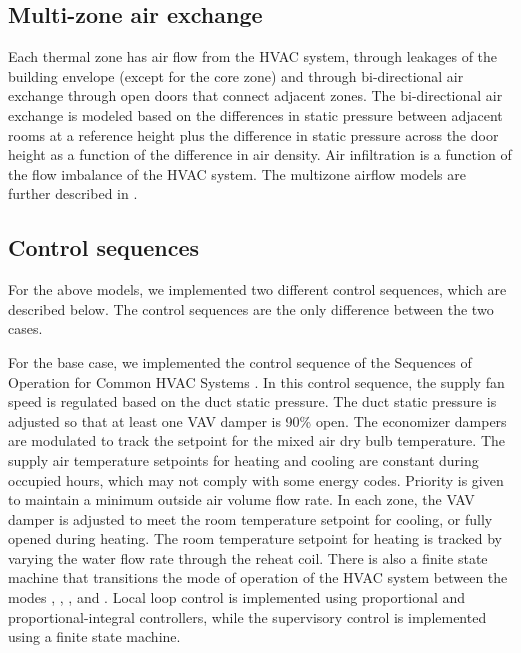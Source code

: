 \documentclass[letterpaper,10pt, openany,english]{sphinxmanual}
\begin{document}
\subsection{Multi-zone air exchange}
\label{\detokenize{example:multi-zone-air-exchange}}
Each thermal zone has air flow from the HVAC system,
through leakages of the building envelope (except for the core zone)
and through bi-directional air exchange through open doors that connect adjacent zones.
The bi-directional air exchange is modeled based on the differences
in static pressure between adjacent rooms at a reference height
plus the difference in static pressure across the door height
as a function of the difference in air density.
Air infiltration is a function of the
flow imbalance of the HVAC system.
The multizone airflow models are further described in
.


\subsection{Control sequences}
\label{\detokenize{example:control-sequences}}\label{\detokenize{example:sec-con-seq-des}}
For the above models, we implemented two different control sequences, which
are described below. The control sequences are the only difference between
the two cases.

For the base case, we implemented the control sequence
 of the Sequences of Operation for
Common HVAC Systems .
In this control sequence, the
supply fan speed is regulated based on the duct static pressure.
The duct static pressure is adjusted
so that at least one VAV damper is 90\% open.
The economizer dampers
are modulated to track the setpoint for the mixed air dry bulb temperature.
The supply air temperature setpoints for heating and cooling are constant
during occupied hours, which may not comply with some energy codes.
Priority is given to maintain a minimum outside air volume flow rate.
In each zone, the VAV damper is adjusted to meet the room temperature
setpoint for cooling, or fully opened during heating.
The room temperature setpoint for heating is tracked by varying
the water flow rate through the reheat coil. There is also a
finite state machine that transitions the mode of operation of
the HVAC system between the modes
, , ,
 and .
Local loop control is implemented using proportional and proportional-integral
controllers, while the supervisory control is implemented
using a finite state machine.
\end{document}
